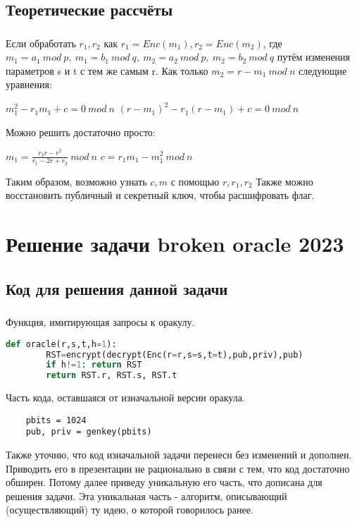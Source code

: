 \documentclass[t]{beamer}
\begin{document}
\subsection{Теоретические рассчёты}
\begin{frame}
	\frametitle{\insertsection}
	\framesubtitle{\insertsubsection}
    Если обработать $r_1,r_2$ как $r_1=Enc(m_1),r_2=Enc(m_2)$, где $m_1=a_1\ mod\ p,\ m_1=b_1\ mod\ q,\ m_2=a_2\ mod\ p,\ m_2=b_2\ mod\ q$ путём изменения параметров s и t с тем же самым r. Как только $m_2=r-m_1\ mod\ n$ следующие уравнения:
    \begin{center}
        $m^2_1-r_1m_1+c=0\ mod\ n$\newline
        $(r-m_1)^2-r_1(r-m_1)+c=0\ mod\ n$
    \end{center}
     Можно решить достаточно просто:
     \begin{center}
        $m_1=\frac{r_2r-r^2}{r_1-2r+r_2}\ mod\ n$\newline
        $c=r_1m_1-m^2_1\ mod\ n$ \newline
    \end{center}
    Таким образом, возможно узнать $c,m$ с помощью $r,r_1,r_2$\newline
    Также можно восстановить публичный и секретный ключ, чтобы расшифровать флаг.
\end{frame}
\section{Решение задачи broken oracle 2023}
\subsection{Код для решения данной задачи}
\begin{frame}[fragile]
\frametitle{\insertsection} 
\framesubtitle{\insertsubsection}
\footnotesize
\smaller
Функция, имитирующая запросы к оракулу.
\begin{lstlisting}[language=Python]
    def oracle(r,s,t,h=1):
        RST=encrypt(decrypt(Enc(r=r,s=s,t=t),pub,priv),pub)
        if h!=1: return RST
        return RST.r, RST.s, RST.t
\end{lstlisting}
Часть кода, оставшаяся от изначальной версии оракула.
\begin{lstlisting}
    pbits = 1024
    pub, priv = genkey(pbits)
\end{lstlisting}
Также уточню, что код изначальной задачи перенесн без изменений и дополнен.
Приводить его в презентации не рационально в связи с тем, что код достаточно обширен.
Потому далее приведу уникальную его часть, что дописана для решения задачи. Эта уникальная часть - алгоритм, описывающий (осуществляющий) ту идею, о которой говорилось ранее.
\end{frame}
\end{document}
